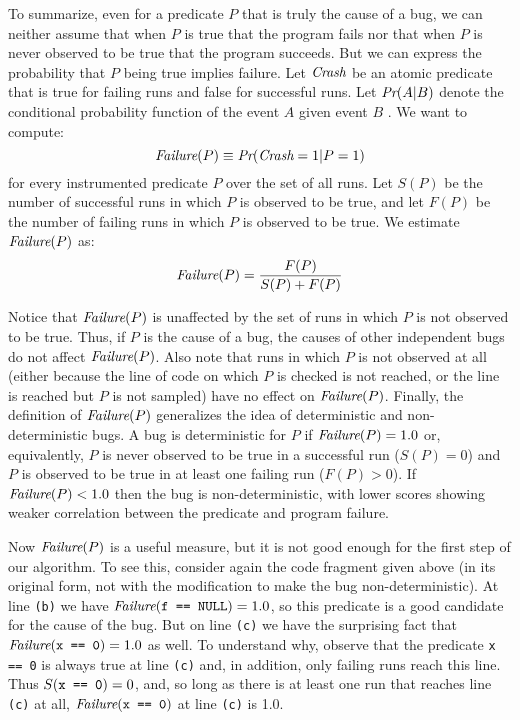 To summarize, even for a predicate $P$ that is truly the cause of a bug, we can neither assume that
when $P$ is true that
the program fails nor that when $P$ is never observed to be true  that
the program succeeds. But we can express the probability that $P$
being true implies failure.  Let $\textit{Crash}$ be an atomic predicate that is
true for failing runs and false for successful runs.  Let $\textit{Pr}(A | B)$ denote
the conditional probability function of the event $A$ given event $B$ .  
We want to compute:
\[ \textit{Failure}(P) \equiv \textit{Pr}(\textit{Crash} = 1 | P = 1) \]
for every instrumented predicate $P$ over the set of all runs.  Let $S(P)$ be the number
of successful runs in which $P$ is observed to be true, and let $F(P)$ be the number of
failing runs in which $P$ is observed to be true.  
We estimate $\textit{Failure}(P)$ as:
\[ \textit{Failure}(P) = \frac{F(P)}{S(P) + F(P)} \]

Notice that $\textit{Failure}(P)$ is unaffected by the set of runs in which
$P$ is not observed to be true.  Thus, if $P$ is the cause of a bug, the
causes of other independent bugs do not affect $\textit{Failure}(P)$.
Also note that runs in which $P$ is not observed at all (either because
the line of code on which $P$ is checked is not reached, or the line is reached
but $P$ is not sampled) have no effect on $\textit{Failure}(P)$.
Finally, the definition of $\textit{Failure}(P)$
generalizes the idea of deterministic and non-deterministic bugs.  A
bug is deterministic for $P$ if $\textit{Failure}(P) = 1.0$ or, equivalently,
$P$ is never observed to be true in a successful run ($S(P) =
0$) and $P$ is observed to be true in at least one failing run ($F(P) > 0$).
If $\textit{Failure}(P) < 1.0$ then the bug is non-deterministic, with
lower scores showing weaker correlation between the predicate and
program failure.

Now $\textit{Failure}(P)$ is a useful measure, but it is not good
enough for the first step of our algorithm. To see this, consider again the
code fragment given above (in its original form, not with the
modification to make the bug non-deterministic).  At line {\tt (b)} we
have $\textit{Failure}(\mbox{\tt f == NULL}) = 1.0$, so this predicate is a good
candidate for the cause of the bug.
But on line {\tt (c)} we have the surprising fact that $\textit{Failure}(\mbox{\tt x == 0}) = 1.0$ as well.
To understand why, observe that the 
predicate \texttt{x == 0} is always true at line {\tt (c)} and, in
addition,
only failing runs reach this line.
Thus $S(\mbox{\tt x == 0}) = 0$, and, so long as there is at least one run that
reaches line {\tt (c)} at all, $\textit{Failure}(\mbox{\tt x == 0})$ at line {\tt (c)} is 1.0.

